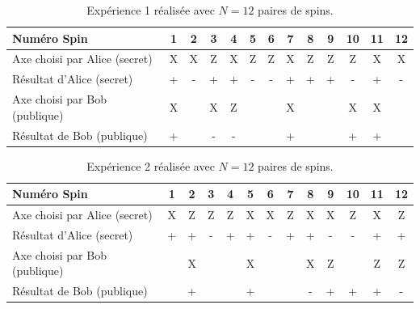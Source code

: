 \begin{table}[htp]
\centering
\begin{tabular}{|l|c|c|c|c|c|c|c|c|c|c|c|c|}\hline
Numéro Spin & 1 &\cellcolor[gray]{.8} 2 & 3 & 4 &\cellcolor[gray]{.8} 5
&\cellcolor[gray]{.8} 6 & 7 &\cellcolor[gray]{.8} 8 &\cellcolor[gray]{.8} 9 & 10
& 11 &\cellcolor[gray]{.8} 12\\\hline
Axe  choisi par Alice (secret) & X &\cellcolor[gray]{.8} X & Z & X
&\cellcolor[gray]{.8} Z &\cellcolor[gray]{.8} Z & X &\cellcolor[gray]{.8} Z
&\cellcolor[gray]{.8} Z & Z & X &\cellcolor[gray]{.8}
X\\\hline
Résultat d'Alice (secret) & + &\cellcolor[gray]{.8} - & + & +
&\cellcolor[gray]{.8} - &\cellcolor[gray]{.8} - & + &\cellcolor[gray]{.8} +
&\cellcolor[gray]{.8} + & - & + &\cellcolor[gray]{.8}
-\\\hline
Axe choisi par Bob (publique) & X &  & X & Z &  &  & X &  &  & X & X &
\\\hline
Résultat de Bob (publique) & + &  & - & - &  &  & + &  &  & + & + & \\\hline
\end{tabular}
\caption{\small Expérience 1 réalisée avec $N=12$ paires de spins.}
\label{tab:Exp1}
\end{table}

\begin{table}[htp]
\centering
\begin{tabular}{|l|c|c|c|c|c|c|c|c|c|c|c|c|}\hline
Numéro Spin & 1 & 2 & 3 & 4 & 5 & 6 & 7 & 8 & 9 & 10 & 11 &  12\\\hline
Axe  choisi par Alice (secret) & X & Z & Z & Z & X & X & Z & X & X & Z & X &
Z\\\hline
Résultat d'Alice (secret) & + & + & - & + & + & - & + & + & - & - & + &
+\\\hline
Axe choisi par Bob (publique) &  & X &  &  & X &  &  & X & Z &  & Z & Z\\\hline
Résultat de Bob (publique) &  &  +&  &  & + &  & & - & + & +& + & -\\\hline
\end{tabular}
\caption{\small Expérience 2 réalisée avec $N=12$ paires de spins.}
\label{tab:Exp2}
\end{table}

